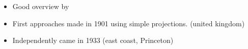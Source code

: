 \begin{itemize}
	\item Good overview by \cite{jolliffe2016principal}
	\item First approaches made in 1901 using simple projections. \cite{pearson1901liii} (united kingdom)
	\item Independently came \cite{hotelling1933analysis} in 1933 (east coast, Princeton)
\end{itemize}





